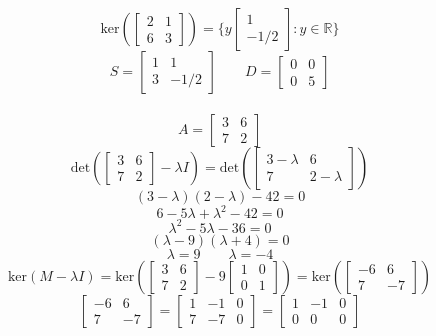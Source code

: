 \documentclass[hidelinks]{article}
\begin{document}
\[
	\text{ker}(\begin{bmatrix} 2 & 1 \\ 6 & 3 \end{bmatrix}) = \{ y \begin{bmatrix} 1 \\ -1/2\end{bmatrix} : y \in \mathbb{R} \}	
\]
\[
	S = \begin{bmatrix} 1 & 1 \\ 3 & -1/2 \end{bmatrix} \quad \quad D = \begin{bmatrix} 0 & 0 \\ 0 & 5 \end{bmatrix}
\]
\\
\[
	A = \begin{bmatrix} 3 & 6 \\ 7 & 2 \end{bmatrix}
\]
\[
	\text{det}(\begin{bmatrix} 3 & 6 \\ 7 & 2 \end{bmatrix} - \lambda I) = \text{det}(\begin{bmatrix} 3 - \lambda & 6 \\ 7 & 2 - \lambda \end{bmatrix}) 
\]
\[
	(3- \lambda)(2 - \lambda) - 42 = 0
\]
\[
	6 - 5\lambda + \lambda^2 - 42 = 0
\]
\[
	\lambda^2 -5\lambda - 36 = 0
\]
\[
	(\lambda - 9)(\lambda + 4) = 0 
\]
\[
	\lambda = 9 \quad \quad \lambda = -4
\]
\[
	\text{ker}(M - \lambda I) = \text{ker}(\begin{bmatrix} 3 & 6 \\ 7 & 2 \end{bmatrix} - 9\begin{bmatrix} 1 & 0 \\ 0 & 1 \end{bmatrix}) = \text{ker}(\begin{bmatrix} -6 & 6 \\ 7 & -7 \end{bmatrix})
\]
\[
	\begin{bmatrix} -6 & 6 \\ 7 & -7 \end{bmatrix}= \begin{bmatrix} 1 & -1 & 0\\ 7 & -7 & 0 \end{bmatrix} =   \begin{bmatrix} 1 & -1 & 0\\ 0 & 0 & 0 \end{bmatrix} 
\]
\end{document}
